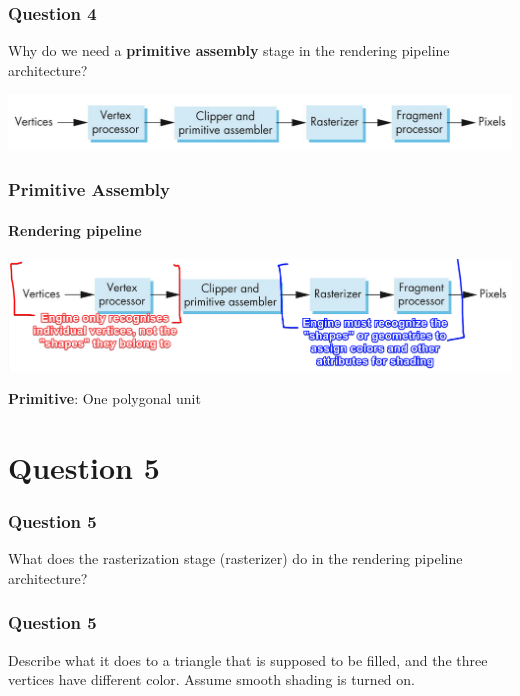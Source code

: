 \documentclass{beamer}
\begin{document}
\begin{frame}
    \frametitle{Question 4}
    Why do we need a \textbf{primitive assembly} stage in the rendering pipeline architecture?

    \vspace{1em}

    {\centering \includegraphics[scale=0.4]{simple-pipeline.png}}
\end{frame}

\begin{frame}
    \frametitle{Primitive Assembly}
    \framesubtitle{Rendering pipeline}
    
    {\centering \includegraphics[scale=0.4]{simple-pipeline-annot.png}}

    \vspace{1em}

    \begin{tcolorbox}
        \textbf{Primitive}: One polygonal unit
    \end{tcolorbox}

\end{frame}

\section{Question 5}

\begin{frame}
    \frametitle{Question 5}
    What does the rasterization stage (rasterizer) do in the rendering pipeline architecture?
\end{frame}

\begin{frame}
    \frametitle{Question 5}
    Describe what it does to a triangle that is supposed to be filled, and the three vertices have
    different color. Assume smooth shading is turned on.
\end{frame}
\end{document}
